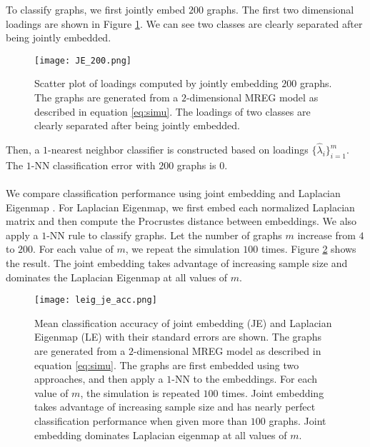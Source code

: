 \documentclass[10pt,journal,compsoc]{IEEEtran}
\begin{document}
\noindent To classify graphs, we first jointly embed $200$ graphs. The first two dimensional loadings are shown in Figure \ref{fig:load}. We can see two classes are clearly separated after being jointly embedded.
\begin{figure}[!htbp]
	\centering
	\texttt{[image: JE\_200.png]}
	\caption{Scatter plot of loadings computed by jointly embedding $200$ graphs. The graphs are generated from a $2$-dimensional MREG model as described in equation \eqref{eq:simu}. The loadings of two classes are clearly separated after being jointly embedded. }
	\label{fig:load}
\end{figure}
Then, a $1$-nearest neighbor classifier is constructed based on loadings $\{\hat{\lambda}_i\}_{i=1}^m$. The $1$-NN classification error with $200$ graphs is $0$. \\
\\
\noindent We compare classification performance using joint embedding and Laplacian Eigenmap \cite{belkin2003laplacian}. For Laplacian Eigenmap, we first embed each normalized Laplacian matrix and then compute the Procrustes distance between embeddings. We also apply a $1$-NN rule to classify graphs. Let the number of graphs $m$ increase from $4$ to $200$. For each value of $m$, we repeat the simulation $100$ times. Figure \ref{fig:acc} shows the result. The joint embedding takes advantage of increasing sample size and dominates the Laplacian Eigenmap at all values of $m$. 
\begin{figure}[!htbp]
	\centering
	\texttt{[image: leig\_je\_acc.png]}
	\caption{Mean classification accuracy of joint embedding (JE) and Laplacian Eigenmap (LE) with their standard errors are shown. The graphs are generated from a $2$-dimensional MREG model as described in equation \eqref{eq:simu}. The graphs are first embedded using two approaches, and then apply a $1$-NN to the embeddings. For each value of $m$, the simulation is repeated $100$ times. Joint embedding takes advantage of increasing sample size and has nearly perfect classification performance when given more than $100$ graphs. Joint embedding dominates Laplacian eigenmap at all values of $m$.}
	\label{fig:acc}
\end{figure} 
\end{document}

